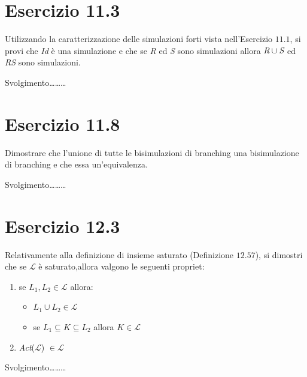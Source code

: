 		\newpage
		
	\section{Esercizio 11.3}
		Utilizzando la caratterizzazione delle simulazioni forti vista
		nell'Esercizio $11.1$, si provi che \emph{Id} \`e una simulazione e che se
		\emph{R} ed \emph{S} sono simulazioni allora $\emph{R} \cup \emph{S}$ ed
		\emph{RS} sono simulazioni.
		
		\sectionline
		
		Svolgimento\ldots\ldots\ldots
			
		\newpage
		
	\section{Esercizio 11.8}
		Dimostrare che l'unione di tutte le bisimulazioni di branching \eacc una
		bisimulazione di branching e che essa \eacc un'equivalenza.
		
		\sectionline
		
		Svolgimento\ldots\ldots\ldots
		
		\newpage
		
	\section{Esercizio 12.3}
		\quad Relativamente alla definizione di insieme saturato (Definizione $12.57$), si dimostri che se $\mathcal{L}$ \`e saturato,allora valgono le
		seguenti propriet\aacc :
		\begin{enumerate}
		  \item se $L_1,L_2 \in \mathcal{L}$ allora:
		  \begin{itemize}
		    \item $L_1 \cup L_2 \in \mathcal{L}$
		    \item se $L_1 \subseteq K \subseteq L_2$ allora $K \in \mathcal{L}$
		  \end{itemize}
		  \item \emph{Act}($\mathcal{L}$) $\in \mathcal{L}$
		\end{enumerate}
		
		\sectionline
		
		Svolgimento\ldots\ldots\ldots